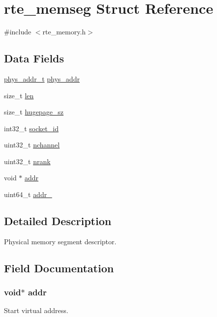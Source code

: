 \hypertarget{structrte__memseg}{}\section{rte\+\_\+memseg Struct Reference}
\label{structrte__memseg}


{\ttfamily \#include $<$rte\+\_\+memory.\+h$>$}

\subsection*{Data Fields}
\begin{DoxyCompactItemize}
\item 
\hyperlink{rte__memory_8h_aeed7e715f3dcfddef6f34dec94037646}{phys\+\_\+addr\+\_\+t} \hyperlink{structrte__memseg_a3901f538726d14b9ad14e0bd7578c959}{phys\+\_\+addr}
\item 
size\+\_\+t \hyperlink{structrte__memseg_a7360b55975153b822efc5217b7734e6a}{len}
\item 
size\+\_\+t \hyperlink{structrte__memseg_a0e9113d25bb493add104f3b95844aaf5}{hugepage\+\_\+sz}
\item 
int32\+\_\+t \hyperlink{structrte__memseg_ac24d1064025151de66984ed53d5d9373}{socket\+\_\+id}
\item 
uint32\+\_\+t \hyperlink{structrte__memseg_a5874f4bcabbfe0fd765d5129d629eabf}{nchannel}
\item 
uint32\+\_\+t \hyperlink{structrte__memseg_a59a112650302067fe308c24133e44d7e}{nrank}
\item 
void $\ast$ \hyperlink{structrte__memseg_ae5bd6c22dbf0f6b5b0ae0233f8eb3704}{addr}
\item 
uint64\+\_\+t \hyperlink{structrte__memseg_a684abacaaf679b13b2ccec687a763b17}{addr\+\_}
\end{DoxyCompactItemize}


\subsection{Detailed Description}
Physical memory segment descriptor. 

\subsection{Field Documentation}
\hypertarget{structrte__memseg_ae5bd6c22dbf0f6b5b0ae0233f8eb3704}{}
\subsubsection[{addr}]{\setlength{\rightskip}{0pt plus 5cm}void$\ast$ addr}\label{structrte__memseg_ae5bd6c22dbf0f6b5b0ae0233f8eb3704}
Start virtual address. \hypertarget{structrte__memseg_a684abacaaf679b13b2ccec687a763b17}{}
